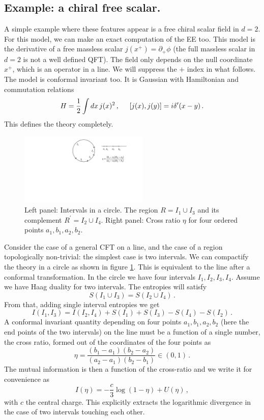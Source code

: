 \documentclass[11pt]{article}
\numberwithin{equation}{section}
\newcommand{\be}{\begin{equation}}
\newcommand{\ee}{\end{equation}}
\begin{document}
\subsection{Example: a chiral free scalar.}
A simple example where these features appear is a free chiral scalar field in $d=2$. For this model, we can make an exact computation of the EE too. This model is the derivative of a free massless scalar $j(x^+)=\partial_+ \phi$ (the full massless scalar in $d=2$ is not a well defined QFT). The field only depends on the null coordinate $x^+$, which is an operator in a line. We will suppress the $+$ index in what follows. The model is conformal invariant too. It is Gaussian with Hamiltonian and  commutation relations  
\be
H=\frac{1}{2}\int dx\, j(x)^2\,,\hspace{.5cm} [j(x),j(y)]=i\delta'(x-y)\,.\label{conr}
\ee
This defines the theory completely. 

\begin{figure}[t]
\begin{center}  
\includegraphics[width=0.55\textwidth]{dualityexample2.pdf}
\captionsetup{width=0.9\textwidth}
\caption{Left panel: Intervals in a circle. The region $R=I_1\cup I_3$ and its complement $R^{\prime}=I_2\cup I_4$. 
Right panel: Cross ratio $\eta$ for four ordered points $a_1,b_1,a_2,b_2$.}
\label{dualityexample}
\end{center}  
\end{figure}   


Consider the case of a general CFT on a line, and the case of a region topologically non-trivial: the simplest case is two intervals. We can compactify the theory in a circle as shown in figure \ref{dualityexample}. This is equivalent to the line after a conformal transformation. In the circle we have four intervals $I_1,I_2,I_3,I_4$. Assume we have Haag duality for two intervals. The entropies will satisfy 
\be
S(I_1\cup I_3)=S(I_2\cup I_4)\,.\label{iden}
\ee
From that, adding single interval entropies we get
\be
 I(I_1,I_3)=I(I_2,I_4)+S(I_1)+S(I_3)-S(I_4)-S(I_2)\,.
 \label{1.13}
\ee
A conformal invariant quantity depending on four points $a_1,b_1,a_2,b_2$ (here the end points of the two intervals) on the line must be a function of a single number, the cross ratio, formed out of the coordinates of the four points as
\be
\eta=\frac{(b_1-a_1)(b_2-a_2)}{(a_2-a_1)(b_2-b_1)}\in(0,1)\,.
\ee
The mutual information is then a function of the cross-ratio and we write it for convenience as 
\be
I(\eta)=-\frac{c}{3} \log(1-\eta)+U(\eta)\,,\label{uu}
\ee
with $c$ the central charge. This explicitly extracts the logarithmic divergence in the case of two intervals touching each other. 
\end{document}
